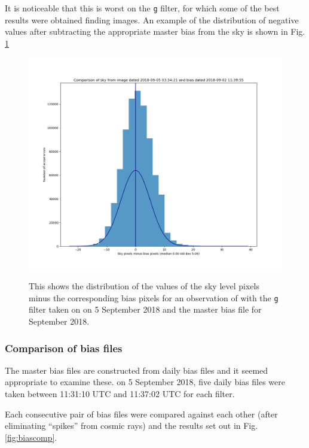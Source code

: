 It is noticeable that this is worst on the \texttt{g} filter, for which some of
the best results were obtained finding images. An example of the distribution of
negative values after subtracting the appropriate master bias from the sky is
shown in Fig.
\ref{fig:negbiaseg}

\begin{figure}[!htbp]
\begin{center}
\includegraphics[scale=0.5]{images/negbiaseg.png}
\end{center}   
\caption{This shows the distribution of the values of the sky level pixels minus
the corresponding bias pixels for an observation of {\bstar} with the \texttt{g}
filter taken on on 5 September 2018 and the master bias file for September 2018.}
\protect\label{fig:negbiaseg}
\end{figure}

\subsubsection{Comparison of bias files}

The master bias files are constructed from daily bias files and it seemed
appropriate to examine these. on 5 September 2018, five daily bias files were
taken between 11:31:10 UTC and 11:37:02 UTC for each filter.

Each consecutive pair of bias files were compared against each other (after
eliminating ``spikes'' from cosmic rays) and the results set out in Fig.
\ref{fig:biascomp}.

